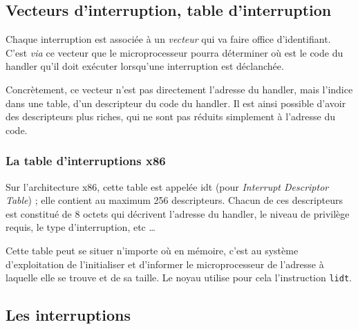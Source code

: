 %
\subsection{Vecteurs d'interruption, table d'interruption}

   Chaque interruption est associée à un {\em vecteur} qui va faire
office d'identifiant. C'est {\em via} ce vecteur que le
microprocesseur pourra déterminer où est le code du handler qu'il doit
exécuter lorsqu'une interruption est déclanchée.

   Concrètement, ce vecteur n'est pas directement l'adresse du
handler, mais l'indice dans une table, d'un descripteur du code du
handler. Il est ainsi possible d'avoir des descripteurs plus riches,
qui ne sont pas réduits simplement à l'adresse du code.

%
\subsubsection{La table d'interruptions x86}

   Sur l'architecture x86, cette table est appelée {\sc idt} (pour
{\em Interrupt Descriptor Table}) ; elle contient au maximum 256
descripteurs. Chacun de ces descripteurs est constitué de 8 octets qui
décrivent l'adresse du handler, le niveau de privilège requis, le type
d'interruption, etc \ldots

   Cette table peut se situer n'importe où en mémoire, c'est au
système d'exploitation de l'initialiser et d'informer le
microprocesseur de l'adresse à laquelle elle se trouve et de sa
taille. Le noyau utilise pour cela l'instruction {\tt lidt}.


%
\subsection{Les interruptions}

%
